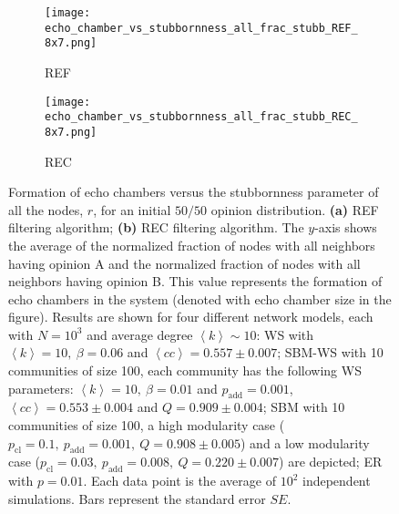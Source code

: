 \documentclass[11 pt , letterpaper , twoside , openright]{book}
\begin{document}
\begin{figure}[H]
  \begin{subfigure}[b]{0.49\textwidth}
    \caption{REF}
  	\texttt{[image: echo\_chamber\_vs\_stubbornness\_all\_frac\_stubb\_REF\_8x7.png]}
    \label{REF_all_frac_stubb}
  \end{subfigure}
  \begin{subfigure}[b]{0.49\textwidth}
    \caption{REC}
  	\texttt{[image: echo\_chamber\_vs\_stubbornness\_all\_frac\_stubb\_REC\_8x7.png]}
    \label{REC_all_frac_stubb}
  \end{subfigure}
  \captionsetup{format=plain}
  \caption[Formation of echo chambers versus the stubbornness parameter of all the nodes, $r$, for the REF and REC filtering algorithms and an initial $50/50$ opinion distribution.]{Formation of echo chambers versus the stubbornness parameter of all the nodes, $r$, for an initial $50/50$ opinion distribution. \textbf{(a)} REF filtering algorithm; \textbf{(b)} REC filtering algorithm. The $y$-axis shows the average of the normalized fraction of nodes with all neighbors having opinion A and the normalized fraction of nodes with all neighbors having opinion B. This value represents the formation of echo chambers in the system (denoted with echo chamber size in the figure). Results are shown for four different network models, each with $N=10^3$ and average degree $\left<k\right> \sim 10$: WS with $\left<k\right> =10,\ \beta = 0.06$ and $\left<cc\right> = 0.557 \pm 0.007$; SBM-WS with 10 communities of size 100, each community has the following WS parameters: $\left<k\right> = 10,\ \beta = 0.01$ and $p_{\text{add}} = 0.001$, $\left<cc\right> = 0.553 \pm 0.004$ and $Q = 0.909 \pm 0.004$; SBM with 10 communities of size 100, a high modularity case ($p_{\text{cl}} = 0.1,\ p_{\text{add}} = 0.001,\ Q = 0.908 \pm 0.005$) and a low modularity case ($p_{\text{cl}} = 0.03,\ p_{\text{add}} = 0.008,\ Q = 0.220 \pm 0.007$) are depicted; ER with $p= 0.01$. Each data point is the average of $10^2$ independent simulations. Bars represent the standard error $SE$.}
\label{echo_vs_all_frac_stubb_REF-REC}
\end{figure}
\noindent
\end{document}
